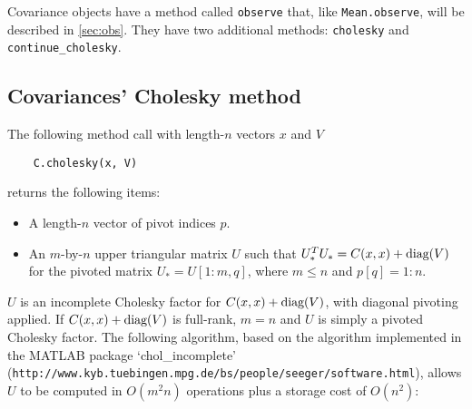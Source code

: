\documentclass{report}
\begin{document}
Covariance objects have a method called \texttt{observe} that, like \texttt{Mean.observe}, will be described in \ref{sec:obs}. They have two additional methods: \texttt{cholesky} and \texttt{continue\_cholesky}.

\subsection{Covariances' Cholesky method}
The following method call with length-$n$ vectors $x$ and $V$
\begin{verbatim}
    C.cholesky(x, V)    
\end{verbatim}
returns the following items:
\begin{itemize}
    \item A length-$n$ vector of pivot indices $p$.
    \item An $m$-by-$n$ upper triangular matrix $U$ such that $U_*^TU_* = C(x,x) + \textup{diag}(V)$ for the pivoted matrix $U_* = U[1:m,q]$, where $m\le n$ and $p[q]=1:n$.
\end{itemize}
$U$ is an incomplete Cholesky factor \cite{incompchol} for $C(x,x)+\textup{diag}(V)$, with diagonal pivoting applied. If $C(x,x)+\textup{diag}(V)$ is full-rank, $m=n$ and $U$ is simply a pivoted Cholesky factor. The following algorithm, based on the algorithm implemented in the MATLAB package `chol\_incomplete' \linebreak
(\texttt{http://www.kyb.tuebingen.mpg.de/bs/people/seeger/software.html}), allows $U$ to be computed in $O(m^2n)$ operations plus a storage cost of $O(n^2)$:
\end{document}
